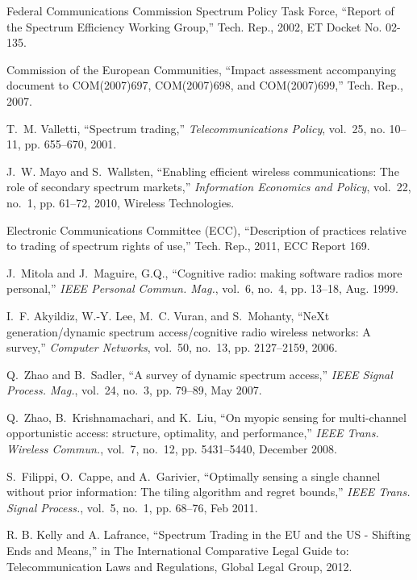 \begin{thebibliography}{1}
{Federal Communications Commission Spectrum Policy Task Force}, ``Report of the
  {S}pectrum {E}fficiency {W}orking {G}roup,'' Tech. Rep., 2002, {ET} {D}ocket
  {N}o. 02-135.

{Commission of the European Communities}, ``Impact assessment accompanying
  document to {COM}(2007)697, {COM}(2007)698, and {COM}(2007)699,'' Tech. Rep.,
  2007.

T.~M. Valletti, ``Spectrum trading,'' \emph{Telecommunications Policy},
  vol.~25, no. 10–11, pp. 655--670, 2001.

J.~W. Mayo and S.~Wallsten, ``Enabling efficient wireless communications: The
  role of secondary spectrum markets,'' \emph{Information Economics and
  Policy}, vol.~22, no.~1, pp. 61--72, 2010, {W}ireless {T}echnologies.

{Electronic Communications Committee (ECC)}, ``Description of practices
  relative to trading of spectrum rights of use,'' Tech. Rep., 2011, {ECC}
  {R}eport 169.

J.~Mitola and J.~Maguire, G.Q., ``Cognitive radio: making software radios more
  personal,'' \emph{{IEEE} Personal Commun. Mag.}, vol.~6, no.~4, pp. 13--18,
  Aug. 1999.

I.~F. Akyildiz, W.-Y. Lee, M.~C. Vuran, and S.~Mohanty, ``{NeXt}
  generation/dynamic spectrum access/cognitive radio wireless networks: A
  survey,'' \emph{Computer Networks}, vol.~50, no.~13, pp. 2127--2159, 2006.

Q.~Zhao and B.~Sadler, ``A survey of dynamic spectrum access,'' \emph{{IEEE}
  Signal Process. Mag.}, vol.~24, no.~3, pp. 79--89, May 2007.

Q.~Zhao, B.~Krishnamachari, and K.~Liu, ``On myopic sensing for multi-channel
  opportunistic access: structure, optimality, and performance,'' \emph{{IEEE}
  Trans. Wireless Commun.}, vol.~7, no.~12, pp. 5431--5440, December 2008.

S.~Filippi, O.~Cappe, and A.~Garivier, ``Optimally sensing a single channel
  without prior information: The tiling algorithm and regret bounds,''
  \emph{{IEEE} Trans. Signal Process.}, vol.~5, no.~1, pp. 68--76, Feb 2011.

 R. B. Kelly and A. Lafrance, \enquote{Spectrum Trading in the EU and the US - Shifting Ends and Means,} in The International Comparative Legal Guide to: Telecommunication Laws and Regulations, Global Legal Group, 2012.


\end{thebibliography}
